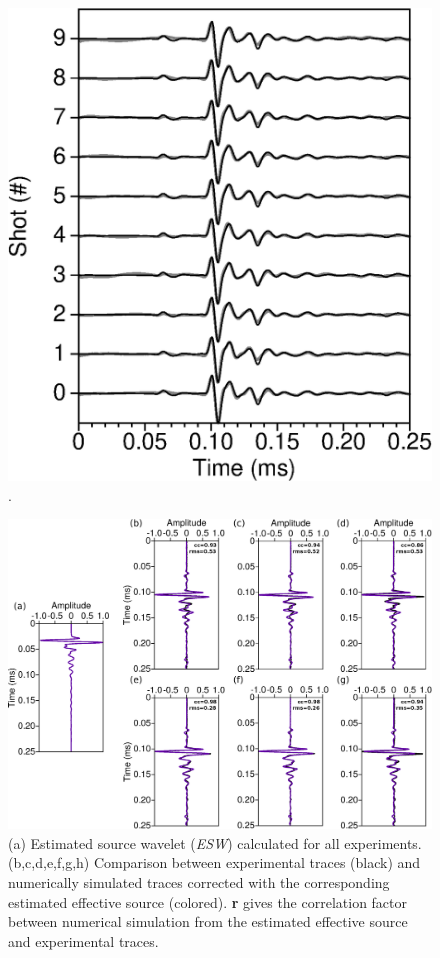 \documentclass[manuscript,revised]{geophysics}
\begin{document}
\begin{figure}[!h]
	\centering
	\includegraphics[scale=1.0]{fig/F50_CT_once.eps}
	\caption{.}
	\label{panel_srcest_2d_comp}
\end{figure}

\begin{figure}[!h]
	\centering
	\includegraphics[scale=0.4]{fig/panel_lswe_all.eps}
	\caption{(a) Estimated source wavelet (\textit{ESW}) calculated for all experiments. (b,c,d,e,f,g,h) Comparison between experimental traces (black) and numerically simulated traces corrected with the corresponding estimated effective source (colored). \textbf{r} gives the correlation factor between numerical simulation from the estimated effective source and experimental traces.}
	\label{panel_srcest_2d_mean}
\end{figure}
\end{document}
